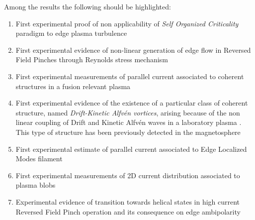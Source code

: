 {Among the results the following should be highlighted:
\begin{enumerate}[itemsep=0.05ex, label=\textbf{\roman*}]
\item First experimental proof of non applicability of \emph{Self
    Organized Criticality} paradigm to edge plasma
  turbulence \parencite{Spada:2001p3574,Antoni:2001p3221}
\item First experimental evidence of non-linear generation of edge
  flow in Reversed Field Pinches through Reynolds stress
  mechanism \parencite{Vianello:2005p1976,Vianello:2005p2671}
\item First experimental measurements of parallel current associated
   to coherent structures in a fusion relevant
   plasma \parencite{Spolaore:2009p4115} 
\item First experimental evidence of the existence of a particular 
  class of coherent structure, named \emph{Drift-Kinetic Alfv\'en
    vortices}, arising because of the non linear coupling of Drift and
  Kinetic Alfv\'en waves in a laboratory plasma \parencite{Vianello:2010p4670}. This type of structure has been
  previously detected in the magnetosphere
\item First experimental estimate of parallel current associated to
   Edge Localized Modes filament \parencite{PhysRevLett.106.125002}
\item First experimental measurements of 2D current distribution
associated to plasma blobs \parencite{Furno:2011cs}
\item Experimental evidence of transition towards helical states in
high current Reversed Field Pinch
operation \parencite{Lorenzini:2009p4248} and its consequence on edge
ambipolarity \parencite{Spizzo:2014jn}
\end{enumerate}
}
